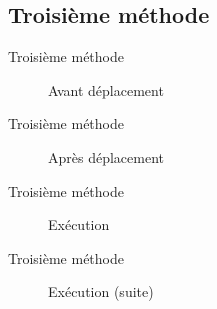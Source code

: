 \subsection{Troisième méthode}
\begin{frame}{Troisième méthode}
	\begin{figure}[h!]
		\centering
		
		\caption{Avant déplacement}
		\label{fig:deplacementMethode3}
	\end{figure}
\end{frame}

\begin{frame}{Troisième méthode}
	\begin{figure}[h!]
		\centering
		
		\caption{Après déplacement}
		\label{fig:deplacementMethode3-2}
	\end{figure}
\end{frame}

\begin{frame}{Troisième méthode}
	\begin{figure}[h!]
		\centering
		
		\caption{Exécution}
		\label{fig:deplacementMethode3-3}
	\end{figure}
\end{frame}

\begin{frame}{Troisième méthode}
	\begin{figure}[h!]
		\centering
		
		\caption{Exécution (suite)}
		\label{fig:deplacementMethode3-4}
	\end{figure}
\end{frame}